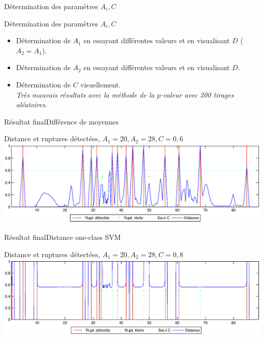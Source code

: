 \begin{frame}{Détermination des paramètres $A_i, C$}

\begin{block}{Détermination des paramètres $A_i, C$}
\begin{itemize}
\item Détermination de $A_1$ en essayant différentes valeurs et en visualisant $D$ ($A_2=A_1$).
\item Détermination de $A_2$ en essayant différentes valeurs et en visualisant $D$.
\item Détermination de $C$ visuellement.\\
\textit{Très mauvais résultats avec la méthode de la $p$-valeur avec 200 tirages aléatoires.}
\end{itemize}
\end{block}

\end{frame}

\begin{frame}{Résultat final}{Différence de moyennes}

{
\begin{exampleblock}{Distance et ruptures détectées, $A_1 = 20, A_2 = 28, C = 0,6$}
\centering
\includegraphics[width=\textwidth]{images/resultatMoy}
\end{exampleblock}
}

\end{frame}

\begin{frame}{Résultat final}{Distance one-class SVM}

{
\begin{exampleblock}{Distance et ruptures détectées, $A_1 = 20, A_2 = 28, C = 0,8$}
\centering
\includegraphics[width=\textwidth]{images/resultatSVM}
\end{exampleblock}
}

\end{frame}
